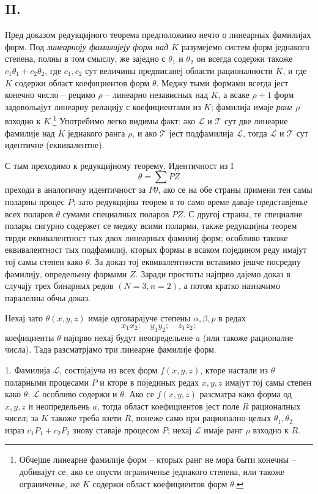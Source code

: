 \documentclass[11pt]{article}
\begin{document}
\subsection*{II.}
Пред доказом редукцијного теорема предположимо нечто о линеарных фамилијах форм. Под {\itshape линеарноју фамилијеју форм над $K$} разумејемо систем форм једнакого степена, полны в том смыслу, же заједно с $\theta_1$ и $\theta_2$ он всегда содержи такоже $c_1\theta_1+c_2\theta_2$, где $c_1,c_2$ сут величины предписанеј области рационалности $K$, и где $K$ содержи област коефициентов форм $\theta$. Меджу тыми формами всегда јест конечно число -- рецимо $\rho$ -- линеарно независных над $K$, а всаке $\rho+1$ форм задовольајут линеарну релацију с коефициентами из $K$; фамилија имаје {\itshape ранг $\rho$} взходно к $K$.\footnote{Обчејше линеарне фамилије форм -- кторых ранг не мора быти конечны -- добивајут се, ако се опусти ограниченье једнакого степена, или такоже ограниченье, же $K$ содержи област коефициентов форм $\theta$.} Употребимо легко видимы факт: ако $\mathcal L$ и $\mathcal T$ сут две линеарне фамилије над $K$ једнакого ранга $\rho$, и ако $\mathcal T$ јест подфамилија $\mathcal L$, тогда $\mathcal L$ и $\mathcal T$ сут идентичне (еквивалентне).

С тым преходимо к редукцијному теорему. Идентичност из I
\[
  \theta=\sum PZ
\]
преходи в аналогичну идентичност за $P\theta$, ако се на обе страны примени тен самы поларны процес $P$; зато редукцијны теорем в то само време даваје представјенье всех поларов $\theta$ сумами специалных поларов $PZ$. С другој страны, те специалне полары сигурно содержет се меджу всими поларми, также редукцијны теорем тврди еквивалентност тых двох линеарных фамилиј форм; особливо такоже еквивалентност тых подфамилиј, кторых формы в всаком поједином реду имајут тој самы степен како $\theta$. За доказ тој еквивалентности вставимо јешче посредну фамилију, определьену формами $Z$. Заради простоты најпрво дајемо доказ в случају трех бинарных редов $(N=3,n=2)$, а потом кратко назначимо паралелны обчы доказ.

Нехај зато $\theta(x,y,z)$ имаје одговарајуче степены $\alpha,\beta,p$ в редах
\[
  x_1x_2;\quad y_1y_2;\quad z_1z_2;
\]
коефициенты $\theta$ најпрво нехај будут неопредельене $a$ (или такоже рационалне числа). Тада разсматрјамо три линеарне фамилије форм.

1. Фамилија $\mathcal L$, состојајуча из всех форм $f(x,y,z)$, кторе настали из $\theta$ поларными процесами $P$ и кторе в појединых редах $x,y,z$ имајут тој самы степен како $\theta$; $\mathcal L$ особливо содержи и $\theta$. Ако се $f(x,y,z)$ разсматра како форма од $x,y,z$ и неопредельень $a$, тогда област коефициентов јест поле $R$ рационалных чисел; за $K$ такоже треба взети $R$, понеже само при рационално-целых $\theta_1,\theta_2$ израз $c_1P_1+c_2P_2$ знову ставаје процесом $P$; нехај $\mathcal L$ имаје ранг $\rho$ взходно к $R$.
\end{document}
